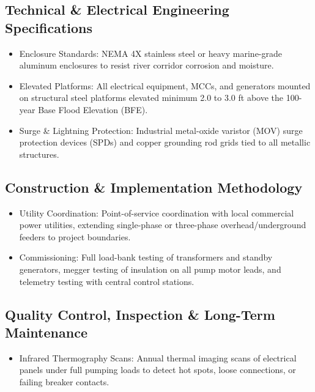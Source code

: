 \documentclass[
  letterpaper,
  DIV=11,
  numbers=noendperiod]{scrreprt}
\providecommand{\tightlist}{%
  \setlength{\itemsep}{0pt}\setlength{\parskip}{0pt}}
\begin{document}
\subsection{Technical \& Electrical Engineering
Specifications}\label{technical-electrical-engineering-specifications}

\begin{itemize}
\item
  Enclosure Standards: NEMA 4X stainless steel or heavy marine-grade
  aluminum enclosures to resist river corridor corrosion and moisture.
\item
  Elevated Platforms: All electrical equipment, MCCs, and generators
  mounted on structural steel platforms elevated minimum 2.0 to 3.0 ft
  above the 100-year Base Flood Elevation (BFE).
\item
  Surge \& Lightning Protection: Industrial metal-oxide varistor (MOV)
  surge protection devices (SPDs) and copper grounding rod grids tied to
  all metallic structures.
\end{itemize}

\subsection{Construction \& Implementation
Methodology}\label{construction-implementation-methodology-18}

\begin{itemize}
\item
  Utility Coordination: Point-of-service coordination with local
  commercial power utilities, extending single-phase or three-phase
  overhead/underground feeders to project boundaries.
\item
  Commissioning: Full load-bank testing of transformers and standby
  generators, megger testing of insulation on all pump motor leads, and
  telemetry testing with central control stations.
\end{itemize}

\subsection{Quality Control, Inspection \& Long-Term
Maintenance}\label{quality-control-inspection-long-term-maintenance-18}

\begin{itemize}
\tightlist
\item
  Infrared Thermography Scans: Annual thermal imaging scans of
  electrical panels under full pumping loads to detect hot spots, loose
  connections, or failing breaker contacts.
\end{itemize}
\end{document}
